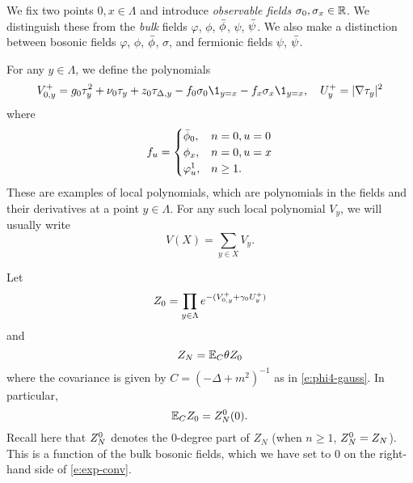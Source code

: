 We fix two points $0,x\in \Lambda$
and introduce \emph{observable fields} $\sigma_0, \sigma_x \in {\mathbb R}$.
We distinguish these from the \emph{bulk} fields $\varphi$, $\phi$,
$\bar\phi$, $\psi$, $\bar\psi$. We also make a distinction between bosonic
fields $\varphi$, $\phi$, $\bar\phi$, $\sigma$, and fermionic fields
$\psi$, $\bar\psi$.

For any $y\in\Lambda$, we define the polynomials
\begin{equation}
\label{e:V0def}
\Vp^+_{0,y}
	=
g_0\tau_y^2 + \nu_0 \tau_y + z_0 \tau_{\Delta,y}
- f_0 \sigma_0 \1_{y=x}
- f_x \sigma_x \1_{y=x},
	\quad
U^+_y
	=
|\nabla \tau_y|^2
\end{equation}
where
\begin{equation}
\label{e:obs-couple}
f_u =
\begin{cases}
\bar\phi_0,		& n = 0, u = 0 \\
\phi_x,			& n = 0, u = x \\
\varphi^1_u,	& n \ge 1.
\end{cases}
\end{equation}
These are examples of local polynomials, which are polynomials
in the fields and their derivatives at a point $y\in\Lambda$. For any such local
polynomial $V_y$, we will usually write
\begin{equation}
\label{e:VX}
V(X) = \sum_{y\in X} V_y.
\end{equation}

Let
\begin{equation}
\label{e:Z0def}
Z_0 = \prod_{y\in \Lambda} e^{-(V^+_{0,y} + \gamma_0 U^+_y)}
\end{equation}
and
\begin{equation}
\label{e:ZNdef}
Z_N = \mathbb{E}_C \theta Z_0
\end{equation}
where the covariance is given by $C = (-\Delta + m^2)^{-1}$
as in \eqref{e:phi4-gauss}. In particular,
\begin{equation}
\label{e:exp-conv}
\mathbb{E}_C Z_0 = Z_N^0(0).
\end{equation}
Recall here that $Z_N^0$ denotes the $0$-degree part of $Z_N$
(when $n \ge 1$, $Z_N^0 = Z_N$).
This is a function of the bulk bosonic fields, which we have set to $0$ on the
right-hand side of \eqref{e:exp-conv}.

